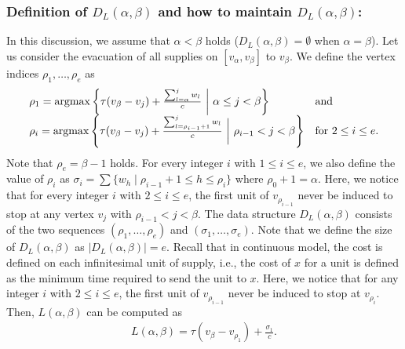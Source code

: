 \documentclass[a4paper]{llncs}
\newcommand{\argmax}{\operatornamewithlimits{argmax}}
\begin{document}
\subsubsection{Definition of $D_L(\alpha, \beta)$ and how to maintain $D_L(\alpha, \beta)$:} 
In this discussion, we assume that $\alpha < \beta$ holds ($D_L(\alpha, \beta) = \emptyset$ when $\alpha = \beta$).
Let us consider the evacuation of all supplies on $[v_\alpha, v_\beta]$ to $v_\beta$.
We define the vertex indices $\rho_1, \ldots, \rho_e$ as 
\begin{eqnarray}
\begin{array}{ll}
	\rho_1 = \argmax \left\{ \tau(v_\beta - v_j) + \frac{\sum_{l=\alpha}^j w_l}{c} \ \bigg| \ \alpha \le j < \beta \right\}		 			& \mbox{and} \\
	\rho_i = \argmax \left\{ \tau(v_\beta - v_j) + \frac{\sum_{l=\rho_{i-1}+1}^j w_l}{c} \ \bigg| \ \rho_{i-1} < j < \beta \right\}	& \mbox{for} \ 2 \le i \le e.
    \end{array}
 \label{eq13}
\end{eqnarray}
Note that $\rho_e = \beta-1$ holds. 
For every integer $i$ with $1 \le i \le e$, we also define the value of $\rho_i$ as $\sigma_i = \sum \{ w_h \mid \rho_{i-1}+1 \le h \le \rho_i \}$ where $\rho_0+1 = \alpha$.
Here, we notice that for every integer $i$ with $2 \le i \le e$, the first unit of $v_{\rho_{i-1}}$ never be induced to stop at any vertex $v_j$ with $\rho_{i-1} < j < \beta$.
The data structure $D_L(\alpha, \beta)$ consists of the two sequences $(\rho_1, \ldots, \rho_e)$ and $(\sigma_1, \ldots, \sigma_e)$.
Note that we define the size of $D_L(\alpha, \beta)$ as $|D_L(\alpha, \beta)| = e$.
Recall that in continuous model, the cost is defined on each infinitesimal unit of supply,
i.e., the cost of $x$ for a unit is defined as the minimum time required to send the unit to $x$.
Here, we notice that for any integer $i$ with $2 \le i \le e$, the first unit of $v_{\rho_{i-1}}$ never be induced to stop at $v_{\rho_i}$.
Then, $L(\alpha, \beta)$ can be computed as 
\begin{eqnarray}
L(\alpha, \beta) =  \tau(v_\beta - v_{\rho_1}) + \frac{\sigma_1}{c}.
\label{eq14}
\end{eqnarray}
\end{document}
